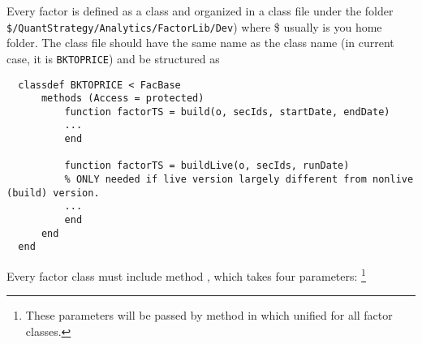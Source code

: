 Every factor is defined as a class and organized in a class file under the folder
\texttt{\$/QuantStrategy/\allowbreak{}Analytics/\allowbreak{}FactorLib/\allowbreak{}Dev})
where \$ usually is you home folder.
The class file should have the same name as the class name 
(in current case, it is \texttt{BKTOPRICE}) and be structured as
\begin{lstlisting}
  classdef BKTOPRICE < FacBase
      methods (Access = protected)
          function factorTS = build(o, secIds, startDate, endDate)
          ...
          end
		
          function factorTS = buildLive(o, secIds, runDate)
          % ONLY needed if live version largely different from nonlive (build) version.
          ...
          end
      end
  end
\end{lstlisting}
       Every factor class must include method , which takes four parameters:
       \footnote{These parameters will be passed by  method in 
       which unified for all factor classes.}

